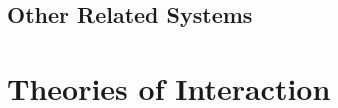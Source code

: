 \subsection{Other Related Systems}


\section{Theories of Interaction}

\cite{Huizinga1949}
\cite{Bernstein1998}

\section{}
